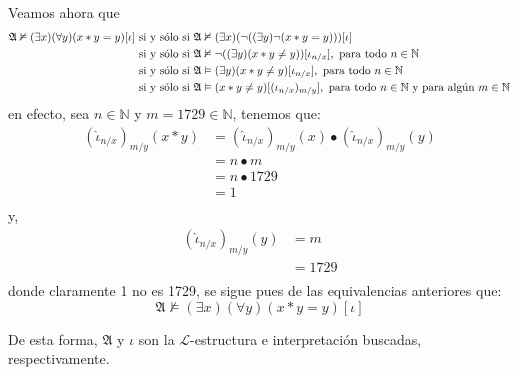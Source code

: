 \documentclass[12pt]{article}
\newcounter{it}
\theoremstyle{largebreak}
\begin{document}
\begin{sol}
        Veamos ahora que
        \begin{equation*}
            \begin{split}
                \mathfrak{A}\nvDash(\exists x)(\forall y)(x*y=y)[\iota]&\textup{ si y sólo si }\mathfrak{A}\nvDash(\exists x)(\neg((\exists y)\neg(x*y= y)))[\iota]\\
                &\textup{ si y sólo si }\mathfrak{A}\nvDash\neg((\exists y)(x*y\neq y))[\iota_{n/x}],\textup{ para todo }n\in\mathbb{N} \\
                &\textup{ si y sólo si }\mathfrak{A}\vDash(\exists y)(x*y\neq y)[\iota_{n/x}],\textup{ para todo }n\in\mathbb{N} \\
                &\textup{ si y sólo si }\mathfrak{A}\vDash(x*y\neq y)[(\iota_{n/x})_{ m/y}],\textup{ para todo }n\in\mathbb{N}\textup{ y para algún }m\in\mathbb{N} \\
            \end{split}
        \end{equation*}
        en efecto, sea $n\in\mathbb{N}$ y $m=1729\in\mathbb{N}$, tenemos que:
        \begin{equation*}
            \begin{split}
                (\hat{\iota}_{ n/x})_{ m/y}(x*y)&=(\hat{\iota}_{ n/x})_{ m/y}(x)\bullet(\hat{\iota}_{ n/x})_{ m/y}(y)\\
                &=n\bullet m\\
                &=n\bullet 1729\\
                &=1\\
            \end{split}
        \end{equation*}
        y,
        \begin{equation*}
            \begin{split}
                (\hat{\iota}_{ n/x})_{ m/y}(y)&=m\\
                &=1729\\
            \end{split}
        \end{equation*}
        donde claramente 1 no es 1729, se sigue pues de las equivalencias anteriores que:
        \begin{equation*}
            \mathfrak{A}\nvDash(\exists x)(\forall y)(x*y=y)[\iota]
        \end{equation*}
        
        De esta forma, $\mathfrak{A}$ y $\iota$ son la $\mathcal{L}$-estructura e interpretación buscadas, respectivamente.
    \end{sol}
\end{document}
